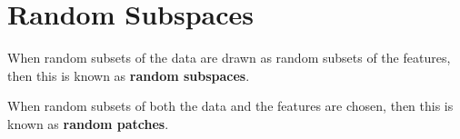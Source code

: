 \section{Random Subspaces}  

  \begin{definition}
    When random subsets of the data are drawn as random subsets of the features, then this is known as \textbf{random subspaces}. 
  \end{definition}

  \begin{definition}
    When random subsets of both the data and the features are chosen, then this is known as \textbf{random patches}. 
  \end{definition}

